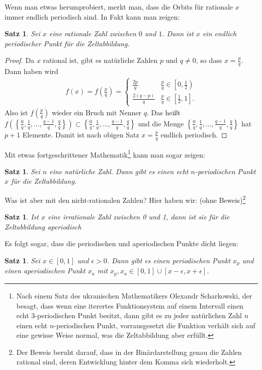 \documentclass[a4paper,ngerman,12pt]{scrartcl}
\theoremstyle{definition}
\theoremstyle{plain}
\newtheorem{satz}[defn]{Satz}
\theoremstyle{remark}
\begin{document}
Wenn man etwas herumprobiert, merkt man, dass die Orbits für rationale $x$ immer endlich periodisch sind. In Fakt kann man zeigen:
\begin{satz}
Sei $x$ eine rationale Zahl zwischen $0$ und $1$. Dann ist $x$ ein endlich periodischer Punkt für die Zeltabbildung. 
\end{satz}
\begin{proof}
Da $x$ rational ist, gibt es natürliche Zahlen $p$ und $q\neq 0$, so dass $x=\frac{p}{q}$. Dann haben wird
\begin{align*}
 f(x) = f\left(\frac{p}{q}\right)=
 \begin{cases}
\frac{2p}{q} & \frac{p}{q}\in \left[0,\frac{1}{2}\right) \\
\frac{2(q-p)}{q} & \frac{p}{q}\in \left[\frac{1}{2},1\right].
\end{cases}
\end{align*}
Also ist $f\left(\frac{p}{q}\right)$ wieder ein Bruch mit Nenner $q$. Das heißt $f\left(\left\{\frac{0}{q},\frac{1}{q},\ldots,\frac{q-1}{q},\frac{q}{q} \right\}\right)\subset \left\{\frac{0}{q},\frac{1}{q},\ldots,\frac{q-1}{q},\frac{q}{q} \right\}$ und die 
Menge $\left\{\frac{0}{q},\frac{1}{q},\ldots,\frac{q-1}{q},\frac{q}{q} \right\}$ hat $p+1$ Elemente. Damit ist nach obigen Satz $x=\frac{p}{q}$ endlich periodisch.
\end{proof}
Mit etwas fortgeschrittener Mathematik\footnote{Nach einem Satz des ukranischen Mathematikers Olexandr Scharkowski, der besagt, dass wenn eine iterertes Funktionsystem auf einem Intervall einen echt 3-periodischen Punkt besitzt, dann gibt es zu jeder natürlichen Zahl $n$ einen echt $n$-periodischen Punkt, vorrausgesetzt die Funktion verhält sich auf eine gewisse Weise normal, was die Zeltabbildung aber erfüllt.} kann man sogar zeigen:
\begin{satz}
Sei $n$ eine natürliche Zahl. Dann gibt es einen echt $n$-periodischen Punkt $x$ für die Zeltabbildung. 
\end{satz}
Was ist aber mit den nicht-rationalen Zahlen?
Hier haben wir: (ohne Beweis)\footnote{Der Beweis beruht darauf, dass in der Binärdarstellung genau die Zahlen rational sind, deren Entwicklung hinter dem Komma sich wiederholt.}
\begin{satz}
Ist $x$ eine irrationale Zahl zwischen 0 und 1, dann ist sie für die Zeltabbildung aperiodisch
\end{satz}
Es folgt sogar, dass die periodischen und aperiodischen Punkte dicht liegen:
\begin{satz}
Sei $x\in[0,1]$ und $\epsilon>0$. Dann gibt es einen periodischen Punkt $x_p$ und einen aperiodischen Punkt $x_a$ mit $x_p, x_a \in [0,1] \cup [x-\epsilon,x+\epsilon]$. 
\end{satz}
\end{document}
